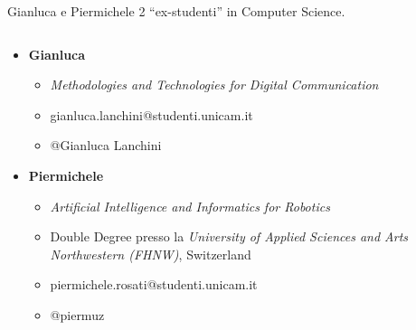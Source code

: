 \begin{frame}{Gianluca e Piermichele}
    2 ``ex-studenti'' in Computer Science.
    \begin{columns}[t]
        \begin{column}{.75\textwidth}
          \begin{itemize}
            \item \textbf{Gianluca}
            \begin{itemize}
            \item<1->[{\texttt{[image: img/books-icon.png]}}] \textit{Methodologies and Technologies for Digital Communication}
            \item<2->[{\texttt{[image: img/gmail-icon.png]}}] gianluca.lanchini@studenti.unicam.it
            \item<2->[{\texttt{[image: img/telegram-logo.png]}}] @Gianluca Lanchini
            \end{itemize}

            \vspace{0.2cm}

            \item \textbf{Piermichele}
            \begin{itemize}
              \item<1->[{\texttt{[image: img/books-icon.png]}}] \textit{Artificial Intelligence and Informatics for Robotics}
              \item<2->[{\texttt{[image: img/swiss-flag.png]}}]  Double Degree presso la \textit{University of Applied Sciences and Arts Northwestern (FHNW)}, Switzerland
              \vspace{0.2cm}
              \item<3->[{\texttt{[image: img/gmail-icon.png]}}] piermichele.rosati@studenti.unicam.it
              \item<3->[{\texttt{[image: img/telegram-logo.png]}}] @piermuz
            \end{itemize}
          \end{itemize}
        \end{column}
        \begin{column}{.4\textwidth}
        \end{column}
      \end{columns}
    \end{frame}